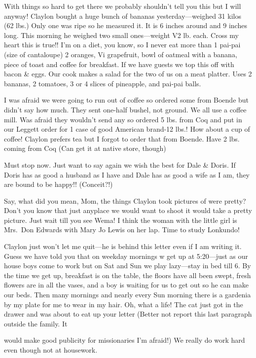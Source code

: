 \documentclass[
]{book}
\begin{document}
With things so hard to get there we probably shouldn't tell you this but I will anyway! Claylon bought a huge bunch of bananas yesterday---weighed 31 kilos (62 lbs.) Only one was ripe so he measured it. It is 6 inches around and 9 inches long. This morning he weighed two small ones---weight V2 lb. each. Cross my heart this is true!! I'm on a diet, you know, so I never eat more than 1 pai-pai (size of cantaloupe) 2 oranges, Vi grapefruit, bowl of oatmeal with a banana, piece of toast and coffee for breakfast. If we have guests we top this off with bacon \& eggs. Our cook makes a salad for the two of us on a meat platter. Uses 2 bananas, 2 tomatoes, 3 or 4 slices of pineapple, and pai-pai balls.

I was afraid we were going to run out of coffee so ordered some from Boende but didn't say how much. They sent one-half bushel, not ground. We all use a coffee mill. Was afraid they wouldn't send any so ordered 5 lbs. from Coq and put in our Leggett order for 1 case of good American brand-12 lbs.! How about a cup of coffee! Claylon prefers tea but I forgot to order that from Boende. Have 2 lbs. coming from Coq (Can get it at native store, though)

Must stop now. Just want to say again we wish the best for Dale \& Doris. If Doris has as good a husband as I have and Dale has as good a wife as I am, they are bound to be happy!! (Conceit?!)

Say, what did you mean, Mom, the things Claylon took pictures of were pretty? Don't you know that just anyplace we would want to shoot it would take a pretty picture. Just wait till you see Wema! I think the woman with the little girl is Mrs.~Don Edwards with Mary Jo Lewis on her lap. Time to study Lonkundo!

Claylon just won't let me quit---he is behind this letter even if I am writing it. Guess we have told you that on weekday mornings w get up at 5:20---just as our house boys come to work but on Sat and Sun we play lazy---stay in bed till 6. By the time we get up, breakfast is on the table, the floors have all been swept, fresh flowers are in all the vases, and a boy is waiting for us to get out so he can make our beds. Then many mornings and nearly every Sun morning there is a gardenia by my plate for me to wear in my hair. Oh, what a life! The cat just got in the drawer and was about to eat up your letter (Better not report this last paragraph outside the family. It

would make good publicity for missionaries I'm afraid!) We really do work hard even though not at housework.
\end{document}
